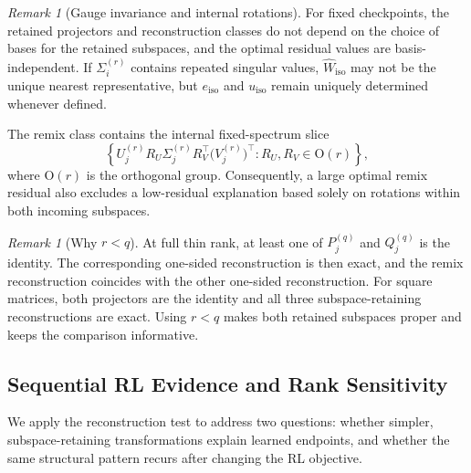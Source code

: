 \documentclass[11pt, a4paper]{utda}
\theoremstyle{plain}
\theoremstyle{definition}
\theoremstyle{remark}
\newtheorem{remark}[theorem]{Remark}
\begin{document}
\begin{remark}[Gauge invariance and internal rotations]
For fixed checkpoints, the retained projectors and reconstruction
classes do not depend on the choice of bases for the retained
subspaces, and the optimal residual values are basis-independent.
If $\Sigma_i^{(r)}$ contains repeated singular values,
$\widehat W_{\mathrm{iso}}$ may not be the unique nearest
representative, but $e_{\mathrm{iso}}$ and $u_{\mathrm{iso}}$
remain uniquely determined whenever defined.

The remix class contains the internal fixed-spectrum slice
\[
    \left\{
        U_j^{(r)}R_U\Sigma_j^{(r)}R_V^\top
        \bigl(V_j^{(r)}\bigr)^\top:
        R_U,R_V\in\mathrm O(r)
    \right\},
\]
where $\mathrm O(r)$ is the orthogonal group.
Consequently, a large optimal remix residual also excludes a
low-residual explanation based solely on rotations within both
incoming subspaces.
\end{remark}

\begin{remark}[Why $r<q$]
At full thin rank, at least one of $P_j^{(q)}$ and $Q_j^{(q)}$
is the identity.
The corresponding one-sided reconstruction is then exact, and
the remix reconstruction coincides with the other one-sided
reconstruction.
For square matrices, both projectors are the identity and all
three subspace-retaining reconstructions are exact.
Using $r<q$ makes both retained subspaces proper and keeps the
comparison informative.
\end{remark}

\subsection{Sequential RL Evidence and Rank Sensitivity}
\label{app:rank}

We apply the reconstruction test to address two questions:
whether simpler, subspace-retaining transformations explain
learned endpoints, and whether the same structural pattern
recurs after changing the RL objective.
\end{document}
